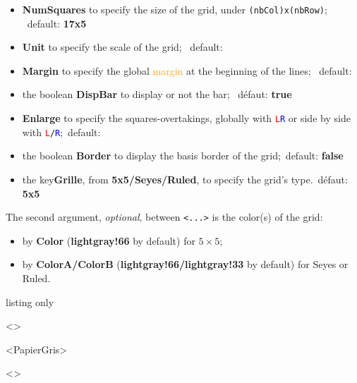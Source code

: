 \documentclass[a4paper]{article}
\newcommand\Cle[1]{{\bfseries\sffamily\textlangle #1\textrangle}}
\begin{document}
\begin{itemize}
	\item \Cle{NumSquares} to specify the size of the grid, under \texttt{(nbCol)x(nbRow)}; \hfill~default: \Cle{17x5}
	\item \Cle{Unit} to specify the scale of the grid; \hfill~default: \Cle{1}
	\item \Cle{Margin} to specify the global \textcolor{orange}{margin} at the beginning of the lines; \hfill~default: \Cle{0}
	\item the boolean \Cle{DispBar} to display or not the bar; \hfill~défaut: \Cle{true}
	\item \Cle{Enlarge} to specify the squares-overtakings, globally with \texttt{\textcolor{red}{L}\textcolor{blue}{R}} or side by side with \texttt{\textcolor{red}{L}/\textcolor{blue}{R}};\hfill~default: \Cle{0}
	\item the boolean \Cle{Border} to display the basis border of the grid;\hfill~default: \Cle{false}
	\item the key\Cle{Grille}, from \Cle{5x5/Seyes/Ruled}, to specify the grid's type.\hfill~défaut: \Cle{5x5}
\end{itemize}

The second argument, \textit{optional}, between \texttt{<...>} is the color(s) of the grid:

\begin{itemize}
	\item by \Cle{Color} (\Cle{lightgray!66} by default) for $5\times5$;
	\item by \Cle{ColorA/ColorB} (\Cle{lightgray!66/lightgray!33} by default) for Seyes or Ruled.
\end{itemize}

\medskip

\begin{PresentationCode}{listing only}
\begin{EnvGrid}[NumSquares=18x4,Grid=Seyes,Margin=3]<\ColSeyes>
\end{EnvGrid}

\begin{EnvGrid}[NumSquares=36x8,Enlarge=3/3]<PapierGris>
\end{EnvGrid}

\begin{center}
	\begin{EnvGrid}[NumSquares=12x3,Grid=Ruled,Margin=2]<\ColRuled>
	\end{EnvGrid}
\end{center}
\end{PresentationCode}
\end{document}

